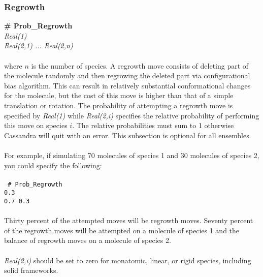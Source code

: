 %
%
%
\subsubsection{Regrowth}
{\bf \# Prob\_Regrowth} \\
{\it Real(1)} \\ 
{\it Real(2,1) ... Real(2,n)} \\ \\
%
where $n$ is the number of species.
A regrowth move consists of deleting part of the molecule randomly and
then regrowing the deleted part via configurational bias algorithm.
This can result in relatively substantial conformational changes for
the molecule, but the cost of this move is higher than that of a
simple translation or rotation. The probability of attempting a
regrowth move is specified by {\it Real(1)} while {\it Real(2,i)}
specifies the relative probability of performing this move on species $i$. 
The relative probabilities must sum to 1 otherwise Cassandra will quit with an error. 
This subsection is optional for all ensembles. \\ \\
%
For example, if simulating 70 molecules of species 1 and 30 molecules of species 2, 
you could specify the following: \\ \\ 
%
\texttt{
\# Prob\_Regrowth \\
0.3 \\
0.7 0.3 } \\ \\
%
Thirty percent of the attempted moves will be regrowth moves.
Seventy percent of the regrowth moves will be attempted on a molecule of species 1
and the balance of regrowth moves on a molecule of species 2. \\ \\
%
{\it Real(2,i)} should be set to zero for monatomic, linear, or rigid species, including solid frameworks.
% 
%
%
